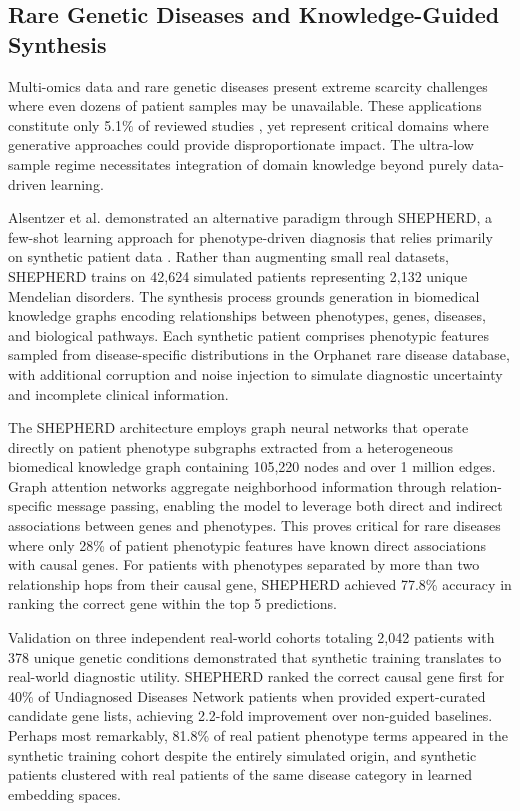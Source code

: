 \subsection{Rare Genetic Diseases and Knowledge-Guided Synthesis}

Multi-omics data and rare genetic diseases present extreme scarcity challenges where even dozens of patient samples may be unavailable. These applications constitute only 5.1\% of reviewed studies \cite{finetti2025data}, yet represent critical domains where generative approaches could provide disproportionate impact. The ultra-low sample regime necessitates integration of domain knowledge beyond purely data-driven learning.

Alsentzer et al. demonstrated an alternative paradigm through SHEPHERD, a few-shot learning approach for phenotype-driven diagnosis that relies primarily on synthetic patient data \cite{alsentzer2025few}. Rather than augmenting small real datasets, SHEPHERD trains on 42,624 simulated patients representing 2,132 unique Mendelian disorders. The synthesis process grounds generation in biomedical knowledge graphs encoding relationships between phenotypes, genes, diseases, and biological pathways. Each synthetic patient comprises phenotypic features sampled from disease-specific distributions in the Orphanet rare disease database, with additional corruption and noise injection to simulate diagnostic uncertainty and incomplete clinical information.

The SHEPHERD architecture employs graph neural networks that operate directly on patient phenotype subgraphs extracted from a heterogeneous biomedical knowledge graph containing 105,220 nodes and over 1 million edges. Graph attention networks aggregate neighborhood information through relation-specific message passing, enabling the model to leverage both direct and indirect associations between genes and phenotypes. This proves critical for rare diseases where only 28\% of patient phenotypic features have known direct associations with causal genes. For patients with phenotypes separated by more than two relationship hops from their causal gene, SHEPHERD achieved 77.8\% accuracy in ranking the correct gene within the top 5 predictions.

Validation on three independent real-world cohorts totaling 2,042 patients with 378 unique genetic conditions demonstrated that synthetic training translates to real-world diagnostic utility. SHEPHERD ranked the correct causal gene first for 40\% of Undiagnosed Diseases Network patients when provided expert-curated candidate gene lists, achieving 2.2-fold improvement over non-guided baselines. Perhaps most remarkably, 81.8\% of real patient phenotype terms appeared in the synthetic training cohort despite the entirely simulated origin, and synthetic patients clustered with real patients of the same disease category in learned embedding spaces.

